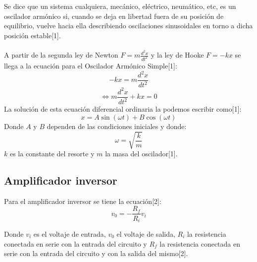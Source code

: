 \documentclass[DIV=calc, paper=a4, fontsize=11pt]{scrartcl}
\begin{document}
\begin{multicols}{2}
Se dice que un sistema cualquiera, mecánico, eléctrico, neumático, etc, es un oscilador armónico si, cuando se deja en libertad fuera de su posición de equilibrio, vuelve hacia ella describiendo oscilaciones sinusoidales en torno a dicha posición estable[1].
\\\\
A partir de la segunda ley de Newton $ F=m\frac{d^2 x}{dt^2} $ y la ley de Hooke $F=-kx$ se llega a la ecuación para el Oscilador Armónico Simple[1]:
$$ -kx = m\frac{d^2 x}{dt^2} $$
\begin{equation}
  \iff  m\frac{d^2 x}{dt^2} + kx = 0 %
\end{equation}
La solución de esta ecuación diferencial ordinaria la podemos escribir como[1]:
$$ x= A\sin{(\omega t)}+B\cos{(\omega t)} $$
Donde $A$ y $B$ dependen de las condiciones iniciales y donde:
$$ \omega =\sqrt{\frac{k}{m}} $$
$k$ es la constante del resorte y $m$ la masa del oscilador[1].





\subsection*{Amplificador inversor}
Para el amplificador inversor se tiene la ecuación[2]:
\begin{equation}
    v_0= -\frac{R_f}{R_i} v_i
\end{equation}

Donde $v_{i}$ es el voltaje de entrada, $v_{0}$ el voltaje de salida, $R_{i}$ la resistencia conectada en serie con la entrada del circuito y $R_{f}$ la resistencia conectada en serie con la entrada del circuito y con la salida del mismo[2].


\end{multicols}
\end{document}
